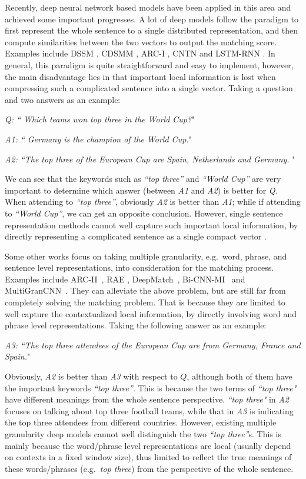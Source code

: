 \documentclass[letterpaper]{article}
\begin{document}
Recently, deep neural network based models have been applied in this area and achieved some important progresses.
A lot of deep models follow the paradigm to first represent the whole sentence to a single distributed representation, and then compute similarities between the two vectors to output the matching score. Examples include DSSM \cite{huang2013learning}, CDSMM \cite{export:226585}, ARC-I \cite{DBLP:conf/nips/HuLLC14}, CNTN \cite{DBLP:conf/ijcai/QiuH15} and LSTM-RNN \cite{palangi2015deep}.
In general, this paradigm is quite straightforward and easy to implement, however, the main disadvantage lies in that important local information is lost when compressing such a complicated sentence into a single vector. Taking a question and two answers as an example:

{\em Q: `` Which teams won top three in the World Cup?}"

{\em A1: `` Germany is the champion of the World Cup.}"

{\em A2: ``The top three of the European Cup are Spain, Netherlands and Germany. }"

We can see that the keywords such as {\em``top three''} and {\em``World Cup''} are very important to determine which answer (between {\em A1} and {\em A2}) is better for {\em Q}. When attending to {\em``top three''}, obviously {\em A2} is better than  {\em A1}; while if attending to {\em``World Cup''}, we can get an opposite conclusion.
However, single sentence representation methods cannot well capture such important local information, by directly representing a complicated sentence as a single compact vector \cite{bahdanau2014neural}.

Some other works focus on taking multiple granularity, e.g.~word, phrase, and sentence level representations, into consideration for the matching process. Examples include ARC-II~\cite{DBLP:conf/nips/HuLLC14}, RAE \cite{socher2011dynamic}, DeepMatch~\cite{DBLP:conf/nips/LuL13}, Bi-CNN-MI~\cite{DBLP:conf/naacl/YinS15} and MultiGranCNN~\cite{DBLP:conf/acl/YinS15}. They can alleviate the above problem, but are still far from completely solving the matching problem.  
That is because they are limited to well capture the contextualized local information, by directly involving word and phrase level representations. Taking the following answer as an example:

{\em A3: ``The top three attendees of the European Cup are from Germany, France and Spain.}"

Obviously, {\em A2} is better than {\em A3} with respect to $Q$, although both of them have the important keywords {\em``top three''}. This is because the two terms of {\em``top three"} have different meanings from the whole sentence perspective. {\em``top three"} in {\em A2} focuses on talking about top three football teams, while that in {\em A3} is indicating the top three attendees from different countries. However, existing multiple granularity deep models cannot well distinguish the two {\em``top three''}s. This is mainly because the word/phrase level representations are local (usually depend on contexts in a fixed window size), thus limited to reflect the true meanings of these words/phrases (e.g.~{\em top three}) from the perspective of the whole sentence.
\end{document}
